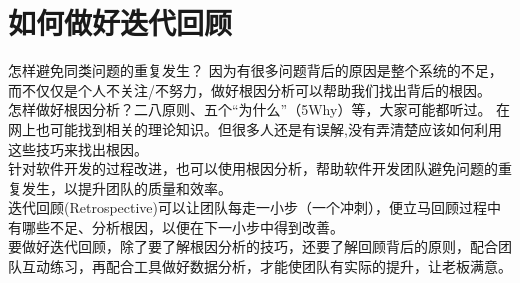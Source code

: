 \documentclass{book}        %
\begin{document}
%



%



%

%

%

%


%

%

\part{如何做好迭代回顾}怎样避免同类问题的重复发生？ 因为有很多问题背后的原因是整个系统的不足， 而不仅仅是个人不关注/不努力，做好根因分析可以帮助我们找出背后的根因。\\

怎样做好根因分析？二八原则、五个“为什么”（5Why）等，大家可能都听过。 在网上也可能找到相关的理论知识。但很多人还是有误解,没有弄清楚应该如何利用这些技巧来找出根因。\\

针对软件开发的过程改进，也可以使用根因分析，帮助软件开发团队避免问题的重复发生，以提升团队的质量和效率。\\

迭代回顾(Retrospective)可以让团队每走一小步（一个冲刺），便立马回顾过程中有哪些不足、分析根因，以便在下一小步中得到改善。\\

要做好迭代回顾，除了要了解根因分析的技巧，还要了解回顾背后的原则，配合团队互动练习，再配合工具做好数据分析，才能使团队有实际的提升，让老板满意。\\
\end{document}
